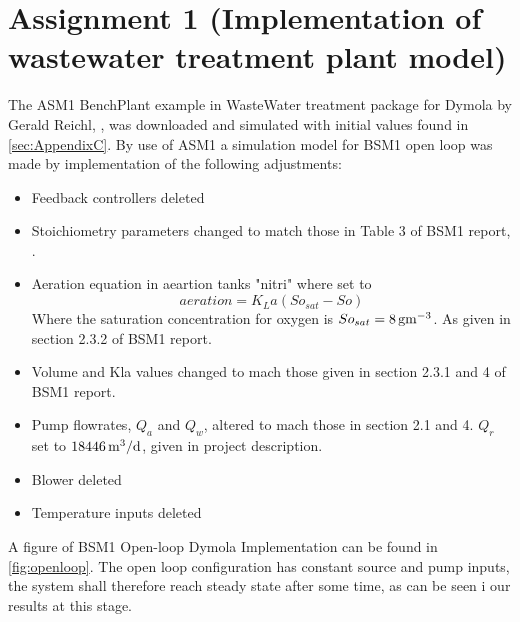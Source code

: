 \section*{Assignment 1 (Implementation of wastewater treatment plant model)}\label{sec:Assignment1}
The ASM1 BenchPlant example in WasteWater treatment package for Dymola by Gerald Reichl, \cite{wastewater}, was downloaded and simulated with initial values found in \ref{sec:AppendixC}. By use of ASM1 a simulation model for BSM1 open loop was made by implementation of the following adjustments:
\begin{itemize}
    \item Feedback controllers deleted
    \item Stoichiometry parameters changed to match those in Table 3 of BSM1 report, \cite{alex2008}.
    \item Aeration equation in aeartion tanks "nitri" where set to 
    \begin{equation}
        aeration=K_La(So_{sat}-So)
    \end{equation}
    Where the saturation concentration for oxygen is $So_{sat}=\unit[8]{gm^{-3}}$. As given in section 2.3.2 of BSM1 report.
    \item Volume and Kla values changed to mach those given in section 2.3.1 and 4 of BSM1 report.
    \item Pump flowrates, $Q_a$ and $Q_w$, altered to mach those in section 2.1 and 4. $Q_r$ set to $\unit[18446]{m^3/d}$, given in project description.   
    \item Blower deleted
    \item Temperature inputs deleted
\end{itemize}
A figure of BSM1 Open-loop Dymola Implementation can be found in \ref{fig:openloop}. The open loop configuration has constant source and pump inputs, the system shall therefore reach steady state after some time, as can be seen i our results at this stage. 